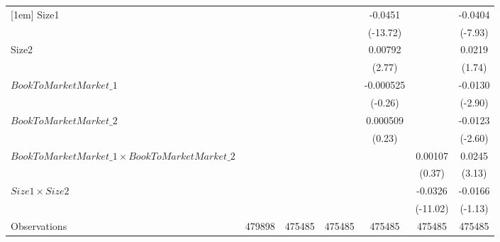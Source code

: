 {\begin{tabular}{l*{6}{c}}
[1em]
Size1               &                     &                     &                     &     -0.0451\sym{***}&                     &     -0.0404\sym{***}\\
                    &                     &                     &                     &    (-13.72)         &                     &     (-7.93)         \\
[1em]
Size2               &                     &                     &                     &     0.00792\sym{**} &                     &      0.0219         \\
                    &                     &                     &                     &      (2.77)         &                     &      (1.74)         \\
[1em]
$ BookToMarketMarket\_1 $&                     &                     &                     &   -0.000525         &                     &     -0.0130\sym{**} \\
                    &                     &                     &                     &     (-0.26)         &                     &     (-2.90)         \\
[1em]
$ BookToMarketMarket\_2 $&                     &                     &                     &    0.000509         &                     &     -0.0123\sym{**} \\
                    &                     &                     &                     &      (0.23)         &                     &     (-2.60)         \\
[1em]
$ BookToMarketMarket\_1 \times BookToMarketMarket\_2 $&                     &                     &                     &                     &     0.00107         &      0.0245\sym{**} \\
                    &                     &                     &                     &                     &      (0.37)         &      (3.13)         \\
[1em]
$ Size1 \times Size2 $&                     &                     &                     &                     &     -0.0326\sym{***}&     -0.0166         \\
                    &                     &                     &                     &                     &    (-11.02)         &     (-1.13)         \\
\hline
Observations        &      479898         &      475485         &      475485         &      475485         &      475485         &      475485         \\

\end{tabular}}

